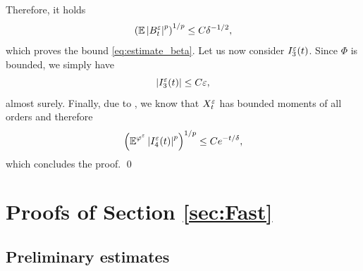 \documentclass[review,onefignum,onetabnum]{siamonline190516}
\begin{document}
\begin{appendices}
	Therefore, it holds
	\begin{equation}
		\left(\operatorname{\mathbb{E}}\left\lvert B_t^\varepsilon\right\rvert^p\right)^{1/p}\leq C \delta^{-1/2},
	\end{equation}
	which proves the bound \eqref{eq:estimate_beta}. Let us now consider $I_3^\varepsilon(t)$. Since $\Phi$ is bounded, we simply have
	\begin{equation}
	\left\lvert I_3^\varepsilon(t)\right\rvert \leq C \varepsilon, 
	\end{equation}
	almost surely. Finally, due to \cite[Corollary 5.4]{PaS07}, we know that $X_t^\varepsilon$ has bounded moments of all orders and therefore
	\begin{equation}
	\left(\operatorname{\mathbb{E}}^{\varphi^\varepsilon} \left\lvert I_4^\varepsilon(t)\right\rvert^p\right)^{1/p} \leq C e^{-t/\delta},
	\end{equation}
	which concludes the proof. \qed

\section{Proofs of Section \ref{sec:Fast}} \label{ap:ProofsDeltaZeta}

\subsection{Preliminary estimates}


\end{appendices}
\end{document}
